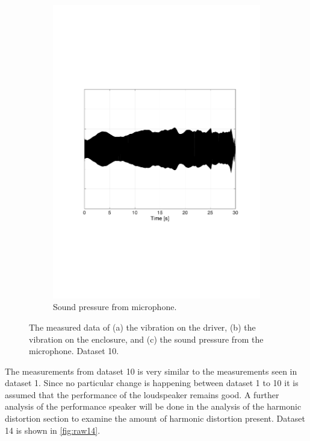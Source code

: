 \begin{figure}[H]
\begin{subfigure}[t]{0.3\textwidth}
	\includegraphics[width=1\textwidth]{figures/raw_microphone10.pdf}
	\caption{Sound pressure from microphone.}
	\label{fig:raw_microphone10}
\end{subfigure}
\caption{The measured data of (a) the vibration on the driver, (b) the vibration on the enclosure, and (c) the sound pressure from the microphone. Dataset 10.}
\label{fig:raw10}
\end{figure} 

The measurements from dataset 10 is very similar to the measurements seen in dataset 1. Since no particular change is happening between dataset 1 to 10 it is assumed that the performance of the loudspeaker remains good. A further analysis of the performance speaker will be done in the analysis of the harmonic distortion section to examine the amount of harmonic distortion present. Dataset 14 is shown in \autoref{fig:raw14}. 

